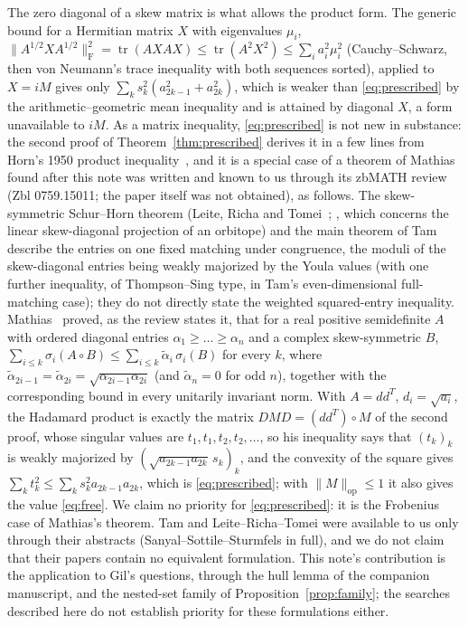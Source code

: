 \documentclass[11pt]{article}
\newcommand{\F}{\mathrm F}
\newcommand{\op}{\mathrm{op}}
\DeclareMathOperator{\tr}{tr}
\begin{document}
\begin{remark}\label{rem:lit}
The zero diagonal of a skew matrix is what allows the product form. The
generic bound for a Hermitian matrix $X$ with eigenvalues $\mu_i$,
$\|A^{1/2}XA^{1/2}\|_\F^2=\tr(AXAX)\le\tr(A^2X^2)\le\sum_ia_i^2\mu_i^{2}$
(Cauchy--Schwarz, then von Neumann's trace inequality with both sequences
sorted), applied to $X=iM$ gives only $\sum_ks_k^2(a_{2k-1}^2+a_{2k}^2)$,
which is weaker than \eqref{eq:prescribed} by the arithmetic--geometric mean
inequality and is attained by diagonal $X$, a form unavailable to $iM$.
As a matrix inequality, \eqref{eq:prescribed} is not new in substance: the
second proof of Theorem~\ref{thm:prescribed} derives it in a few lines from
Horn's 1950 product inequality~\cite{horn50}, and it is a special case of a
theorem of Mathias found after this note was written and known to us through
its zbMATH review (Zbl 0759.15011; the paper itself was not obtained), as
follows. The skew-symmetric Schur--Horn
theorem (Leite, Richa and Tomei~\cite{lrt}; \cite[Prop.~3.10]{sss}, which
concerns the linear skew-diagonal projection of an orbitope) and the main
theorem of Tam~\cite{tam} describe the entries on one fixed matching under
congruence, the moduli of the skew-diagonal entries being weakly majorized by
the Youla values (with one further inequality, of Thompson--Sing type, in
Tam's even-dimensional full-matching case); they do not
directly state the weighted squared-entry inequality. Mathias~\cite{mathias}
proved, as the review states it, that for a real positive semidefinite $A$
with ordered diagonal entries $\alpha_1\ge\dots\ge\alpha_n$ and a complex
skew-symmetric $B$,
$\sum_{i\le k}\sigma_i(A\circ B)\le\sum_{i\le k}\tilde\alpha_i\,\sigma_i(B)$
for every $k$, where $\tilde\alpha_{2i-1}=\tilde\alpha_{2i}=\sqrt{\alpha_{2i-1}\alpha_{2i}}$
(and $\tilde\alpha_n=0$ for odd $n$), together with the corresponding bound in
every unitarily invariant norm. With $A=dd^T$, $d_i=\sqrt{a_i}$, the Hadamard
product is exactly the matrix $DMD=(dd^T)\circ M$ of the second proof, whose
singular values are $t_1,t_1,t_2,t_2,\dots$, so his inequality says that
$(t_k)_k$ is weakly majorized by $(\sqrt{a_{2k-1}a_{2k}}\,s_k)_k$, and the
convexity of the square gives $\sum_kt_k^2\le\sum_ks_k^2a_{2k-1}a_{2k}$,
which is \eqref{eq:prescribed}; with $\|M\|_\op\le1$ it also gives the value
\eqref{eq:free}. We claim no priority for \eqref{eq:prescribed}: it is the
Frobenius case of Mathias's theorem. Tam and Leite--Richa--Tomei were
available to us only through their abstracts (Sanyal--Sottile--Sturmfels in
full), and we do not claim that their papers contain no equivalent
formulation. This note's contribution is the application to Gil's questions, through
the hull lemma of the companion manuscript, and the nested-set family of
Proposition~\ref{prop:family}; the searches described here do not establish
priority for these formulations either.
\end{remark}
\end{document}
